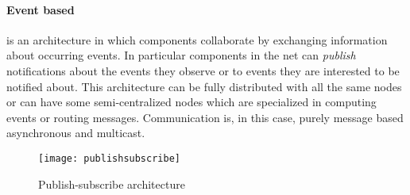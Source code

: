 \paragraph{Event based} is an architecture in which components collaborate by exchanging information about occurring events. In particular components in the net can \textit{publish} notifications about the events they observe or  to events they are interested to be notified about. This architecture can be fully distributed with all the same nodes or can have some semi-centralized nodes which are specialized in computing events or routing messages. Communication is, in this case, purely message based asynchronous and multicast. 
\begin{figure}[h]
	\centering
	\texttt{[image: publishsubscribe]}
	\caption{Publish-subscribe architecture}
	\label{fig:2.14}
\end{figure} \\\\\\

